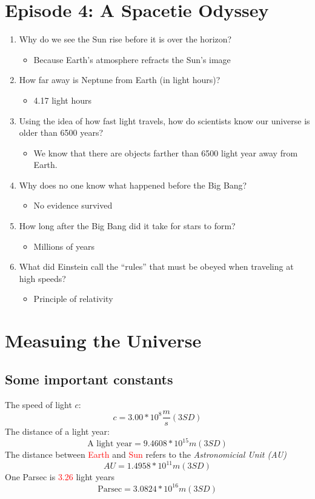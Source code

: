 \section{Episode 4: A Spacetie Odyssey}
\begin{enumerate}
    \item Why do we see the Sun rise before it is over the horizon?
    \begin{itemize}
        \item Because Earth's atmosphere refracts the Sun's image
    \end{itemize}
    \item How far away is Neptune from Earth (in light hours)?
    \begin{itemize}
        \item 4.17 light hours
    \end{itemize}
    \item Using the idea of how fast light travels, how do scientists know our universe is older than 6500 years?
    \begin{itemize}
        \item We know that there are objects farther than 6500 light year away from Earth. 
    \end{itemize}
    \item Why does no one know what happened before the Big Bang?
    \begin{itemize}
        \item No evidence survived
    \end{itemize}
    \item How long after the Big Bang did it take for stars to form?
    \begin{itemize}
        \item Millions of years
    \end{itemize}
    \item What did Einstein call the “rules” that must be obeyed when traveling at high speeds?
    \begin{itemize}
        \item Principle of relativity
    \end{itemize}
\end{enumerate}

\section{Measuing the Universe}

\subsection{Some important constants}
The speed of light $c$:
\[
    c = 3.00 * 10^8\frac{m}{s} (3SD)
\]
The distance of a light year:
\[
    \text{A light year} = 9.4608 * 10^{15} m (3SD)
\]
The distance between \textcolor{red}{Earth} and \textcolor{red}{Sun} refers to the \textit{Astronomicial Unit (AU)}
\[
    AU = 1.4958 * 10^{11}m (3SD)
\]
One Parsec is \textcolor{red}{3.26} light years \[
\text{Parsec} = 3.0824 * 10^{16}m (3SD)
\]

